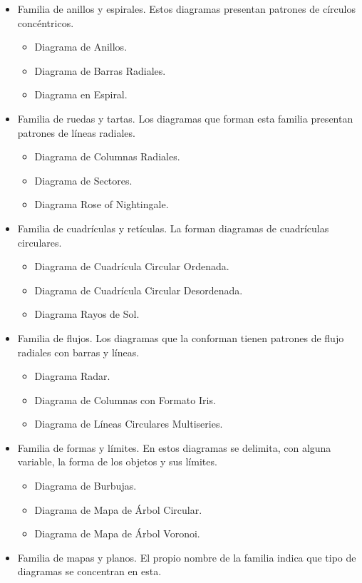 \documentclass{article}\usepackage[]{graphicx}\usepackage[]{color}
\begin{document}
\begin{itemize}
\item Familia de anillos y espirales. Estos diagramas presentan patrones de c\'irculos conc\'entricos.
\begin{itemize}
  \item Diagrama de Anillos.
  \item Diagrama de Barras Radiales.
  \item Diagrama en Espiral.
\end{itemize}
\item Familia de ruedas y tartas. Los diagramas que forman esta familia presentan patrones de l\'ineas radiales.
\begin{itemize}
  \item Diagrama de Columnas Radiales.
  \item Diagrama de Sectores.
  \item Diagrama Rose of Nightingale.
\end{itemize}
\item Familia de cuadr\'iculas y ret\'iculas. La forman diagramas de cuadr\'iculas circulares.
\begin{itemize}
  \item Diagrama de Cuadr\'icula Circular Ordenada.
  \item Diagrama de Cuadr\'icula Circular Desordenada.
  \item Diagrama  Rayos de Sol.
\end{itemize}
\item Familia de flujos. Los diagramas que la conforman tienen patrones de flujo radiales con barras y l\'ineas.
\begin{itemize}
  \item Diagrama  Radar.
  \item Diagrama de Columnas con Formato Iris.
  \item Diagrama de L\'ineas Circulares Multiseries.
\end{itemize}
\item Familia de formas y l\'imites. En estos diagramas se delimita, con alguna variable, la forma de los objetos y sus l\'imites.
\begin{itemize}
  \item Diagrama de Burbujas.
  \item Diagrama de Mapa de \'Arbol Circular.
  \item Diagrama de Mapa de \'Arbol Voronoi.
\end{itemize}
\item Familia de mapas y planos. El propio nombre de la familia indica que tipo de diagramas se concentran en esta.

\end{itemize}
\end{document}
